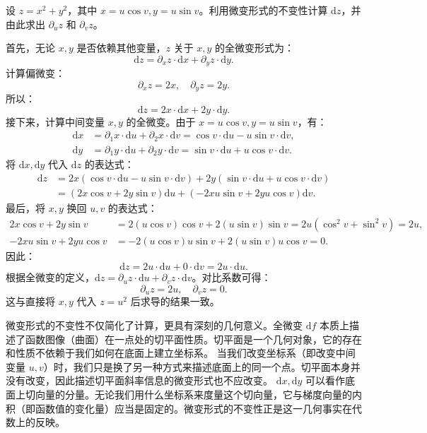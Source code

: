\documentclass[12pt,UTF8]{ctexbook}
\begin{document}
\begin{et}
设 $z = x^2 + y^2$，其中 $x = u \cos v, y = u \sin v$。利用微变形式的不变性计算 $\mathrm{d}z$，并由此求出 $\partial_u z$ 和 $\partial_v z$。
\end{et}
\begin{so}
首先，无论 $x, y$ 是否依赖其他变量，$z$ 关于 $x, y$ 的全微变形式为：
$$ \mathrm{d}z = \partial_x z \cdot \mathrm{d}x + \partial_y z \cdot \mathrm{d}y. $$
计算偏微变：
$$ \partial_x z = 2x, \quad \partial_y z = 2y. $$
所以：
$$ \mathrm{d}z = 2x \cdot \mathrm{d}x + 2y \cdot \mathrm{d}y. $$
接下来，计算中间变量 $x, y$ 的全微变。由于 $x = u \cos v, y = u \sin v$，有：
\begin{align*}
\mathrm{d}x &= \partial_1 x \cdot \mathrm{d}u + \partial_2 x \cdot \mathrm{d}v = \cos v \cdot \mathrm{d}u - u \sin v \cdot \mathrm{d}v, \\
\mathrm{d}y &= \partial_1 y \cdot \mathrm{d}u + \partial_2 y \cdot \mathrm{d}v = \sin v \cdot \mathrm{d}u + u \cos v \cdot \mathrm{d}v.
\end{align*}
将 $\mathrm{d}x, \mathrm{d}y$ 代入 $\mathrm{d}z$ 的表达式：
\begin{align*}
\mathrm{d}z &= 2x (\cos v \cdot \mathrm{d}u - u \sin v \cdot \mathrm{d}v) + 2y (\sin v \cdot \mathrm{d}u + u \cos v \cdot \mathrm{d}v) \\
&= (2x \cos v + 2y \sin v) \mathrm{d}u + (-2x u \sin v + 2y u \cos v) \mathrm{d}v.
\end{align*}
最后，将 $x, y$ 换回 $u, v$ 的表达式：
\begin{align*}
2x \cos v + 2y \sin v &= 2(u \cos v) \cos v + 2(u \sin v) \sin v = 2u (\cos^2 v + \sin^2 v) = 2u, \\
-2x u \sin v + 2y u \cos v &= -2(u \cos v) u \sin v + 2(u \sin v) u \cos v = 0.
\end{align*}
因此：
$$ \mathrm{d}z = 2u \cdot \mathrm{d}u + 0 \cdot \mathrm{d}v = 2u \cdot \mathrm{d}u. $$
根据全微变的定义，$\mathrm{d}z = \partial_u z \cdot \mathrm{d}u + \partial_v z \cdot \mathrm{d}v$。对比系数可得：
$$ \partial_u z = 2u, \quad \partial_v z = 0. $$
这与直接将 $x, y$ 代入 $z = u^2$ 后求导的结果一致。
\end{so}

微变形式的不变性不仅简化了计算，更具有深刻的几何意义。全微变 $\mathrm{d}f$ 本质上描述了函数图像（曲面）在一点处的切平面性质。切平面是一个几何对象，它的存在和性质不依赖于我们如何在底面上建立坐标系。
当我们改变坐标系（即改变中间变量 $u, v$）时，我们只是换了另一种方式来描述底面上的同一个点。切平面本身并没有改变，因此描述切平面斜率信息的微变形式也不应改变。
$\mathrm{d}x, \mathrm{d}y$ 可以看作底面上切向量的分量。无论我们用什么坐标系来度量这个切向量，它与梯度向量的内积（即函数值的变化量）应当是固定的。微变形式的不变性正是这一几何事实在代数上的反映。
\end{document}
